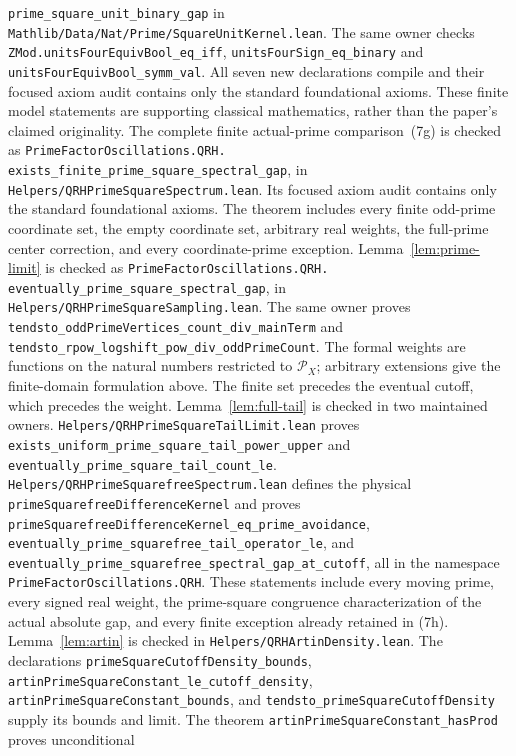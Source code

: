 \documentclass[11pt]{article}
\newcommand{\Pcal}{\mathcal P}
\begin{document}
\texttt{prime\_square\_unit\_binary\_gap} in
\texttt{Mathlib/Data/Nat/Prime/SquareUnitKernel.lean}.
The same owner checks
\texttt{ZMod.unitsFourEquivBool\_eq\_iff},
\texttt{unitsFourSign\_eq\_binary} and
\texttt{unitsFourEquivBool\_symm\_val}.
All seven new declarations compile and their focused axiom audit contains
only the standard foundational axioms.
These finite model statements are supporting classical mathematics,
rather than the paper's claimed originality.
The complete finite actual-prime comparison~(7g) is checked as
\texttt{PrimeFactorOscillations.QRH.}
\texttt{exists\_finite\_prime\_square\_spectral\_gap}, in
\texttt{Helpers/QRHPrimeSquareSpectrum.lean}.
Its focused axiom audit contains only the standard foundational axioms.
The theorem includes every finite odd-prime coordinate set, the empty
coordinate set, arbitrary real weights, the full-prime center correction,
and every coordinate-prime exception.
Lemma~\ref{lem:prime-limit} is checked as
\texttt{PrimeFactorOscillations.QRH.}
\texttt{eventually\_prime\_square\_spectral\_gap}, in
\texttt{Helpers/QRHPrimeSquareSampling.lean}.
The same owner proves
\texttt{tendsto\_oddPrimeVertices\_count\_div\_mainTerm} and
\texttt{tendsto\_rpow\_logshift\_pow\_div\_oddPrimeCount}.
The formal weights are functions on the natural numbers restricted to
\(\Pcal_X\); arbitrary extensions give the finite-domain formulation above.
The finite set precedes the eventual cutoff, which precedes the weight.
Lemma~\ref{lem:full-tail} is checked in two maintained owners.
\texttt{Helpers/QRHPrimeSquareTailLimit.lean} proves
\texttt{exists\_uniform\_prime\_square\_tail\_power\_upper} and
\texttt{eventually\_prime\_square\_tail\_count\_le}.
\texttt{Helpers/QRHPrimeSquarefreeSpectrum.lean} defines the physical
\texttt{primeSquarefreeDifferenceKernel} and proves
\texttt{primeSquarefreeDifferenceKernel\_eq\_prime\_avoidance},
\texttt{eventually\_prime\_squarefree\_tail\_operator\_le}, and
\texttt{eventually\_prime\_squarefree\_spectral\_gap\_at\_cutoff},
all in the namespace \texttt{PrimeFactorOscillations.QRH}.
These statements include every moving prime, every signed real weight,
the prime-square congruence characterization of the actual absolute gap,
and every finite exception already retained in (7h).
Lemma~\ref{lem:artin} is checked in \texttt{Helpers/QRHArtinDensity.lean}.
The declarations
\texttt{primeSquareCutoffDensity\_bounds},
\texttt{artinPrimeSquareConstant\_le\_cutoff\_density},
\texttt{artinPrimeSquareConstant\_bounds}, and
\texttt{tendsto\_primeSquareCutoffDensity} supply its bounds and limit.
The theorem \texttt{artinPrimeSquareConstant\_hasProd} proves unconditional
\end{document}
